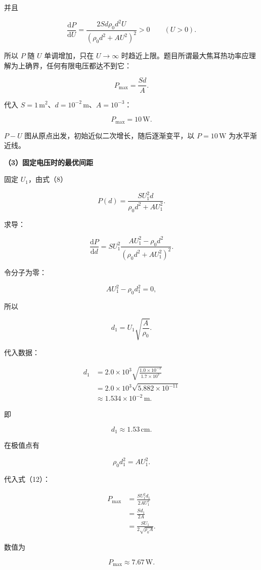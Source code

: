 \documentclass[12pt,a4paper,UTF8]{ctexart}
\begin{document}
并且

\[
\frac{\mathrm dP}{\mathrm dU}
=\frac{2Sd\rho_0d^2U}
{(\rho_0d^2+AU^2)^2}>0
\qquad(U>0).
\tag{10}
\]

所以 \(P\) 随 \(U\) 单调增加，只在 \(U\to\infty\)
时趋近上限。题目所谓最大焦耳热功率应理解为上确界，任何有限电压都达不到它：

\[
P_{\max}=\frac{Sd}{A}.
\]

代入 \(S=1\,\mathrm{m^2}\)、\(d=10^{-2}\,\mathrm m\)、\(A=10^{-3}\)：

\[
\boxed{P_{\max}=10\,\mathrm W}.
\tag{11}
\]

\(P-U\) 图从原点出发，初始近似二次增长，随后逐渐变平，以
\(P=10\,\mathrm W\) 为水平渐近线。

\textbf{（3）固定电压时的最优间距}

固定 \(U_1\)，由式（8）

\[
P(d)=\frac{SU_1^2d}{\rho_0d^2+AU_1^2}.
\tag{12}
\]

求导：

\[
\frac{\mathrm dP}{\mathrm dd}
=SU_1^2
\frac{AU_1^2-\rho_0d^2}
{(\rho_0d^2+AU_1^2)^2}.
\tag{13}
\]

令分子为零：

\[
AU_1^2-\rho_0d_1^2=0,
\]

所以

\[
\boxed{d_1=U_1\sqrt{\frac A{\rho_0}}}.
\tag{14}
\]

代入数据：

\[
\begin{aligned}
d_1
&=2.0\times10^3
\sqrt{\frac{1.0\times10^{-3}}{1.7\times10^7}}\\
&=2.0\times10^3\sqrt{5.882\times10^{-11}}\\
&\approx1.534\times10^{-2}\,\mathrm m.
\end{aligned}
\]

即

\[
\boxed{d_1\approx1.53\,\mathrm{cm}}.
\tag{15}
\]

在极值点有

\[
\rho_0d_1^2=AU_1^2.
\]

代入式（12）：

\[
\begin{aligned}
P_{\max}
&=\frac{SU_1^2d_1}{2AU_1^2}\\
&=\frac{Sd_1}{2A}\\
&=\frac{SU_1}{2\sqrt{\rho_0A}}.
\end{aligned}
\]

数值为

\[
\boxed{P_{\max}\approx7.67\,\mathrm W}.
\tag{16}
\]
\end{document}
